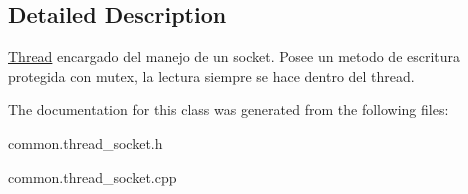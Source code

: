 \subsection{Detailed Description}
\hyperlink{classThread}{Thread} encargado del manejo de un socket. Posee un metodo de escritura protegida con mutex, la lectura siempre se hace dentro del thread. 

The documentation for this class was generated from the following files\-:\begin{DoxyCompactItemize}
\item 
common.\-thread\-\_\-socket.\-h\item 
common.\-thread\-\_\-socket.\-cpp\end{DoxyCompactItemize}
